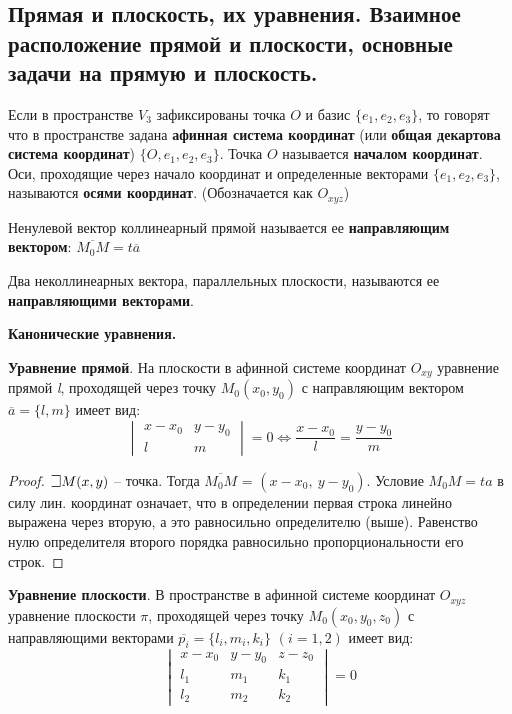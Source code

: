 \subsection{Прямая и плоскость, их уравнения. Взаимное расположение прямой и плоскости,  основные задачи на прямую и плоскость.}

Если в пространстве $V_3$ зафиксированы точка $O$ и базис $\{e_1, e_2, e_3\}$, то говорят что в пространстве задана \textbf{афинная система координат} (или \textbf{общая декартова система координат}) $\{O, e_1, e_2, e_3\}$. Точка $O$ называется \textbf{началом координат}. Оси, проходящие через начало координат и определенные векторами $\{e_1, e_2, e_3\}$, называются \textbf{осями координат}. (Обозначается как $O_{xyz}$)

Ненулевой вектор коллинеарный прямой называется ее \textbf{направляющим вектором}: $\overline{M_0M} = t \overline{a}$   

Два неколлинеарных вектора, параллельных плоскости, называются ее \textbf{направляющими векторами}. 


\bigbreak
\centerline{\textbf{Канонические уравнения.}}

\textbf{Уравнение прямой}. На плоскости в афинной системе координат $O_{xy}$ уравнение прямой \textit{l}, проходящей через точку $M_0(x_0,y_0)$ с направляющим вектором $\overline{a}=\{l,m\}$ имеет вид:
$$\begin{vmatrix} x-x_0 & y-y_0 \\ l & m \end{vmatrix} = 0 \iff \frac{x-x_0}{l} = \frac{y-y_0}{m} $$
\begin{proof}
$\mathLet M(x,y)$ -- точка. Тогда $\overline{M_0M}$ = $(x - x_0, ~ y - y_0)$. Условие $M_0M = ta$ в силу лин. координат означает, что в определении первая строка линейно выражена через вторую, а это равносильно определителю (выше). Равенство нулю определителя второго порядка равносильно пропорциональности его строк.
\end{proof}


\textbf{Уравнение плоскости}. 
В пространстве в афинной системе координат $O_{xyz}$ уравнение плоскости $\pi$, проходящей через точку $M_0(x_0,y_0,z_0)$ с направляющими векторами $\overline{p_i}=\{l_i,m_i,k_i\}$ $(i=1,2)$ имеет вид:
$$\begin{vmatrix} x-x_0 & y-y_0 & z-z_0\\ l_1 & m_1 & k_1 \\ l_2 & m_2 & k_2 \end{vmatrix} = 0 $$

